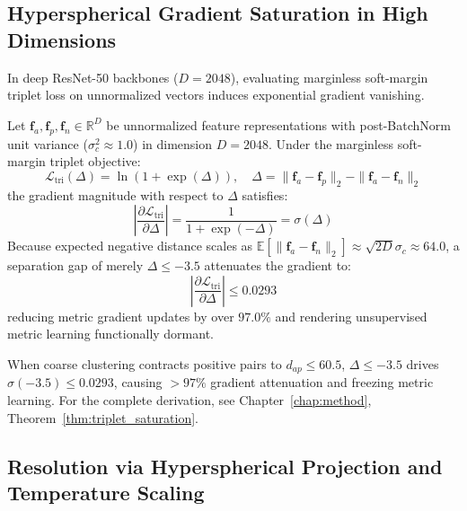 \subsection{Hyperspherical Gradient Saturation in High Dimensions}
\label{subsec:saturation_analysis}

In deep ResNet-50 backbones ($D=2048$), evaluating marginless soft-margin triplet loss on unnormalized vectors induces exponential gradient vanishing.

\begin{theorem}
\label{sec:lit_hyperspherical_saturation}
Let $\mathbf{f}_a, \mathbf{f}_p, \mathbf{f}_n \in \mathbb{R}^D$ be unnormalized feature representations with post-BatchNorm unit variance ($\sigma_c^2 \approx 1.0$) in dimension $D = 2048$. Under the marginless soft-margin triplet objective:
\begin{equation}
\label{eq:thm_lit_triplet_loss}
\mathcal{L}_{\text{tri}}(\Delta) = \ln\left(1 + \exp(\Delta)\right), \quad \Delta = \|\mathbf{f}_a - \mathbf{f}_p\|_2 - \|\mathbf{f}_a - \mathbf{f}_n\|_2
\end{equation}
the gradient magnitude with respect to $\Delta$ satisfies:
\begin{equation}
\label{eq:thm_lit_gradient_formula}
\left| \frac{\partial \mathcal{L}_{\text{tri}}}{\partial \Delta} \right| = \frac{1}{1 + \exp(-\Delta)} = \sigma(\Delta)
\end{equation}
Because expected negative distance scales as $\mathbb{E}[\|\mathbf{f}_a - \mathbf{f}_n\|_2] \approx \sqrt{2D}\sigma_c \approx 64.0$, a separation gap of merely $\Delta \le -3.5$ attenuates the gradient to:
\begin{equation}
\label{eq:thm_lit_gradient_attenuation}
\left| \frac{\partial \mathcal{L}_{\text{tri}}}{\partial \Delta} \right| \le 0.0293
\end{equation}
reducing metric gradient updates by over $97.0\%$ and rendering unsupervised metric learning functionally dormant.
\end{theorem}

When coarse clustering contracts positive pairs to $d_{ap} \le 60.5$, $\Delta \le -3.5$ drives $\sigma(-3.5) \le 0.0293$, causing $>97\%$ gradient attenuation and freezing metric learning. For the complete derivation, see Chapter~\ref{chap:method}, Theorem~\ref{thm:triplet_saturation}.

\subsection{Resolution via Hyperspherical Projection and Temperature Scaling}
\label{subsec:resolution_hypersphere}

